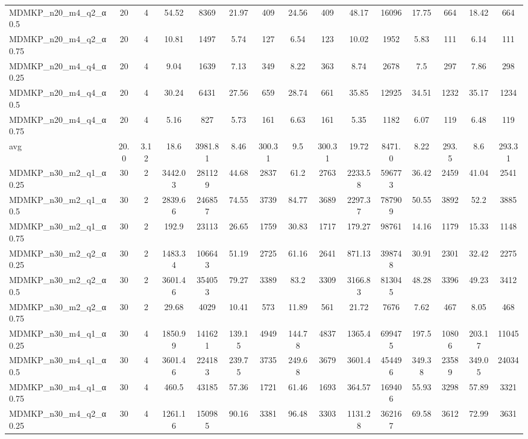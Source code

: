 \begin{table}[!ht]
{\begin{tabular}{lcccccccccccccc}
MDMKP\_n20\_m4\_q2\_α0.5 & 20 & 4 & 54.52 & 8369 & 21.97 & 409 & 24.56 & 409 & 48.17 & 16096 & 17.75 & 664 & 18.42 & 664 \\
MDMKP\_n20\_m4\_q2\_α0.75 & 20 & 4 & 10.81 & 1497 & 5.74 & 127 & 6.54 & 123 & 10.02 & 1952 & 5.83 & 111 & 6.14 & 111 \\
MDMKP\_n20\_m4\_q4\_α0.25 & 20 & 4 & 9.04 & 1639 & 7.13 & 349 & 8.22 & 363 & 8.74 & 2678 & 7.5 & 297 & 7.86 & 298 \\
MDMKP\_n20\_m4\_q4\_α0.5 & 20 & 4 & 30.24 & 6431 & 27.56 & 659 & 28.74 & 661 & 35.85 & 12925 & 34.51 & 1232 & 35.17 & 1234 \\
MDMKP\_n20\_m4\_q4\_α0.75 & 20 & 4 & 5.16 & 827 & 5.73 & 161 & 6.63 & 161 & 5.35 & 1182 & 6.07 & 119 & 6.48 & 119 \\
\hline avg & 20.0 & 3.12 & 18.6& 3981.81 & 8.46& 300.31 & 9.5& 300.31 & 19.72& 8471.0 & 8.22& 293.5 & 8.6& 293.31\\ \hline
MDMKP\_n30\_m2\_q1\_α0.25 & 30 & 2 & 3442.03 & 281129 & 44.68 & 2837 & 61.2 & 2763 & 2233.58 & 596773 & 36.42 & 2459 & 41.04 & 2541 \\
MDMKP\_n30\_m2\_q1\_α0.5 & 30 & 2 & 2839.66 & 246857 & 74.55 & 3739 & 84.77 & 3689 & 2297.37 & 787909 & 50.55 & 3892 & 52.2 & 3885 \\
MDMKP\_n30\_m2\_q1\_α0.75 & 30 & 2 & 192.9 & 23113 & 26.65 & 1759 & 30.83 & 1717 & 179.27 & 98761 & 14.16 & 1179 & 15.33 & 1148 \\
MDMKP\_n30\_m2\_q2\_α0.25 & 30 & 2 & 1483.34 & 106643 & 51.19 & 2725 & 61.16 & 2641 & 871.13 & 398748 & 30.91 & 2301 & 32.42 & 2275 \\
MDMKP\_n30\_m2\_q2\_α0.5 & 30 & 2 & 3601.46 & 354053 & 79.27 & 3389 & 83.2 & 3309 & 3166.83 & 813045 & 48.28 & 3396 & 49.23 & 3412 \\
MDMKP\_n30\_m2\_q2\_α0.75 & 30 & 2 & 29.68 & 4029 & 10.41 & 573 & 11.89 & 561 & 21.72 & 7676 & 7.62 & 467 & 8.05 & 468 \\
MDMKP\_n30\_m4\_q1\_α0.25 & 30 & 4 & 1850.99 & 141621 & 139.15 & 4949 & 144.78 & 4837 & 1365.4 & 699475 & 197.5 & 10806 & 203.17 & 11045 \\
MDMKP\_n30\_m4\_q1\_α0.5 & 30 & 4 & 3601.46 & 224183 & 239.75 & 3735 & 249.68 & 3679 & 3601.4 & 454496 & 349.38 & 23589 & 349.05 & 24034 \\
MDMKP\_n30\_m4\_q1\_α0.75 & 30 & 4 & 460.5 & 43185 & 57.36 & 1721 & 61.46 & 1693 & 364.57 & 169406 & 55.93 & 3298 & 57.89 & 3321 \\
MDMKP\_n30\_m4\_q2\_α0.25 & 30 & 4 & 1261.16 & 150985 & 90.16 & 3381 & 96.48 & 3303 & 1131.28 & 362167 & 69.58 & 3612 & 72.99 & 3631 \\

\end{tabular}}
\end{table}

